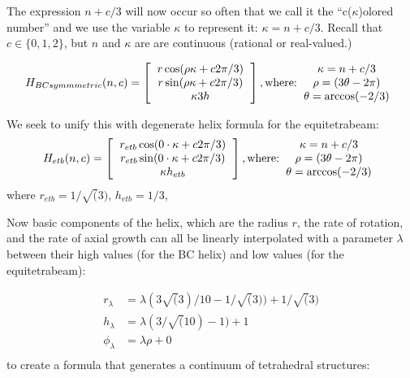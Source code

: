 \documentclass[11pt]{article}
\begin{document}
The expression $n+c/3$ will now occur so often that we call it the ``c($\kappa$)olored number'' and we use the variable $\kappa$ to represent it: $\kappa = n+c/3$.
Recall that $c \in \{0,1,2\}$, but $n$ and $\kappa$ are are continuous (rational or real-valued.)

\[
H_{BCsymmmetric}(n,c) =
\left [
  \begin{tabular}{c}
   $ r  \cos(\rho \kappa  + c 2 \pi /3) $\\
   $ r  \sin(\rho \kappa  + c 2 \pi /3) $\\
   $ \kappa 3  h $
  \end{tabular}
  \right ],
\text{where:}
  \begin{tabular}{c}
 $\kappa = n + c/3$ \\
    $\rho = (3 \theta - 2 \pi)$ \\
   $ \theta = \arccos(-2/3) $
  \end{tabular}      
\]

We seek to unify this with degenerate helix formula for the equitetrabeam:
\[
H_{etb}(n,c) =
\left [
  \begin{tabular}{c}
   $ r_{etb}  \cos( 0 \cdot \kappa  + c 2 \pi /3) $\\
   $ r_{etb}  \sin( 0 \cdot \kappa  + c 2 \pi /3) $\\
   $ \kappa h_{etb} $
  \end{tabular}
\right ],
\text{where:}
  \begin{tabular}{c}
 $\kappa = n + c/3$ \\
    $\rho = (3 \theta - 2 \pi)$ \\
   $ \theta = \arccos(-2/3) $
  \end{tabular}      
\]
where $ r_{etb} = 1/\sqrt(3)$, $h_{etb} = 1/3$,

Now basic components of the helix, which are the radius $r$, the rate of rotation, and the rate of
axial growth can all be linearly interpolated with a parameter $\lambda$ between their high values (for the BC helix)
and low values (for the equitetrabeam):

\begin{align*}
r_{\lambda}  &=  \lambda (3 \sqrt(3) / 10 - 1/\sqrt(3)) +  1/\sqrt(3) \\
h_{\lambda} &=   \lambda (3 / \sqrt(10) - 1)+ 1 \\
\phi_{\lambda} &=  \lambda \rho  + 0\\
\end{align*}
to create a formula that generates a continuum of tetrahedral structures:
\end{document}

